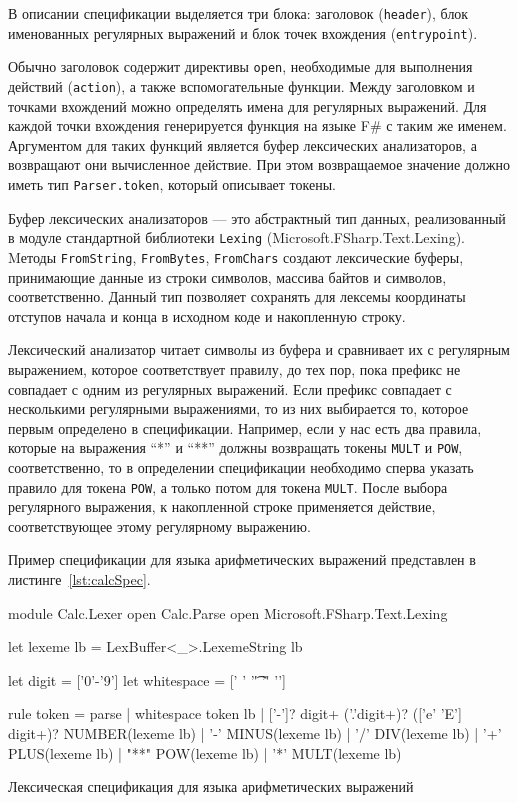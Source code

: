 \documentclass[10pt, conference, compsocconf]{IEEEtran}
\begin{document}
В описании спецификации выделяется три блока: заголовок (\verb|header|), блок именованных регулярных выражений и блок точек вхождения (\verb|entrypoint|). 

Обычно заголовок содержит директивы \verb|open|, необходимые для выполнения действий (\verb|action|), а также вспомогательные функции. Между заголовком и точками вхождений можно определять имена для регулярных выражений. Для каждой точки вхождения генерируется функция на языке F\# с таким же именем. Аргументом для таких функций является буфер лексических анализаторов, а возвращают они вычисленное действие. При этом возвращаемое значение должно иметь тип \verb|Parser.token|, который описывает токены. 

Буфер лексических анализаторов --- это абстрактный тип данных,  реализованный в модуле стандартной библиотеки \verb|Lexing| (Microsoft.FSharp.Text.Lexing). Mетоды \verb|FromString|, \verb|FromBytes|, \verb|FromChars| создают лексические буферы, принимающие данные из строки символов, массива  байтов и символов, соответственно. Данный тип позволяет сохранять для лексемы координаты отступов начала и конца в исходном коде и накопленную строку. 

Лексический анализатор читает символы из буфера и сравнивает их с регулярным выражением, которое соответствует правилу, до тех пор, пока префикс не совпадает с одним  из регулярных выражений. Если префикс совпадает с несколькими регулярными выражениями, то из них выбирается то, которое первым определено в спецификации. Например, если у нас есть два правила, которые на выражения ``*'' и ``**'' должны возвращать токены \verb|MULT| и \verb|POW|, соответственно, то в определении спецификации необходимо сперва указать правило для токена \verb|POW|, а только потом для токена \verb|MULT|. После выбора регулярного выражения, к накопленной строке применяется действие, соответствующее этому регулярному выражению. 

Пример спецификации для языка арифметических выражений представлен в листинге~\ref{lst:calcSpec}.

\begin{listing}[h]
\begin{pyglist}[language=csharp,numbers=none,numbersep=5pt]
{
module Calc.Lexer
open Calc.Parse 
open Microsoft.FSharp.Text.Lexing

let lexeme lb = LexBuffer<_>.LexemeString lb
}

let digit = ['0'-'9']
let whitespace = [' ' '\t' '\r' '\n']

rule token = parse
| whitespace { token lb }
| ['-']? digit+ ('.'digit+)? (['e' 'E'] digit+)?
       { NUMBER(lexeme lb) }
| '-'  { MINUS(lexeme lb) }
| '/'  { DIV(lexeme lb) }
| '+'  { PLUS(lexeme lb) }
| "**" { POW(lexeme lb) }
| '*'  { MULT(lexeme lb) }

\end{pyglist}
\caption{Лексическая спецификация для языка арифметических выражений}
\label{lst:calcSpec}
\end{listing}
\end{document}
